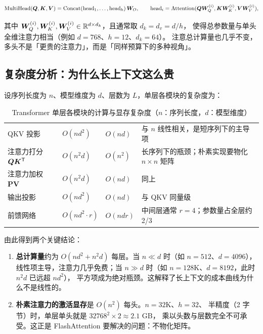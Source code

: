 \begin{equation}
\text{MultiHead}(\bm{Q}, \bm{K}, \bm{V}) = \operatorname{Concat}(\text{head}_1, \dots, \text{head}_h)\,\bm{W}_O,
\qquad \text{head}_i = \text{Attention}(\bm{Q}\bm{W}_Q^{(i)}, \bm{K}\bm{W}_K^{(i)}, \bm{V}\bm{W}_V^{(i)}) ,
\label{eq:multihead}
\end{equation}

其中 $\bm{W}_Q^{(i)}, \bm{W}_K^{(i)}, \bm{W}_V^{(i)} \in \mathbb{R}^{d \times d_k}$，且通常取 $d_k = d_v = d / h$，
使得总参数量与单头全维注意力相当（例如 $d = 768$、$h = 12$、$d_k = 64$）。
注意总计算量也几乎不变，多头不是「更贵的注意力」，而是「同样预算下的多种视角」。

\subsection{复杂度分析：为什么长上下文这么贵}

设序列长度为 $n$、模型维度为 $d$、层数为 $L$，单层各模块的复杂度为：

\begin{table}[htbp]
\centering
\caption{Transformer 单层各模块的计算与显存复杂度（$n$：序列长度，$d$：模型维度）}
\label{tab:transformer-complexity}
\small
\begin{tabularx}{\textwidth}{L{3.5cm} L{3.0cm} L{2.6cm} Y}
\toprule
{} &  &  &  \\
\midrule
QKV 投影 & $O(n d^2)$ & $O(nd)$ & 与 $n$ 线性相关，是短序列下的主导项 \\
\addlinespace
注意力打分 $\bm{Q}\bm{K}^{\mathsf{T}}$ & $O(n^2 d)$ & $O(n^2)$ & 长序列下的瓶颈；朴素实现要物化 $n \times n$ 矩阵 \\
\addlinespace
注意力加权 $\bm{P}\bm{V}$ & $O(n^2 d)$ & $O(nd)$ & 同上 \\
\addlinespace
输出投影 & $O(n d^2)$ & $O(nd)$ & 与 QKV 同量级 \\
\addlinespace
前馈网络 & $O(n d^2 \cdot r)$ & $O(n d r)$ & 中间层通常 $r = 4$；参数量占全层约 2/3 \\
\bottomrule
\end{tabularx}
\end{table}

由此得到两个关键结论：

\begin{enumerate}
  \item \textbf{总计算量}约为 $O(n d^2 + n^2 d)$ 每层。当 $n \ll d$ 时（如 $n = 512$、$d = 4096$），
        线性项主导，注意力几乎免费；当 $n \gg d$ 时（如 $n = 128\text{K}$、$d = 8192$，此时 $n^2 d$ 已远超 $nd^2$），
        平方项成为绝对瓶颈。这解释了长上下文的成本曲线为什么不是线性的。
  \item \textbf{朴素注意力的激活显存}是 $O(n^2)$ 每头。$n = 32\text{K}$、$h = 32$、
        半精度（2 字节）时，单层单头就是 $32768^2 \times 2 \approx 2.1$ GB，
        乘以头数与层数完全不可承受。这正是 FlashAttention 要解决的问题：不物化矩阵。
\end{enumerate}

